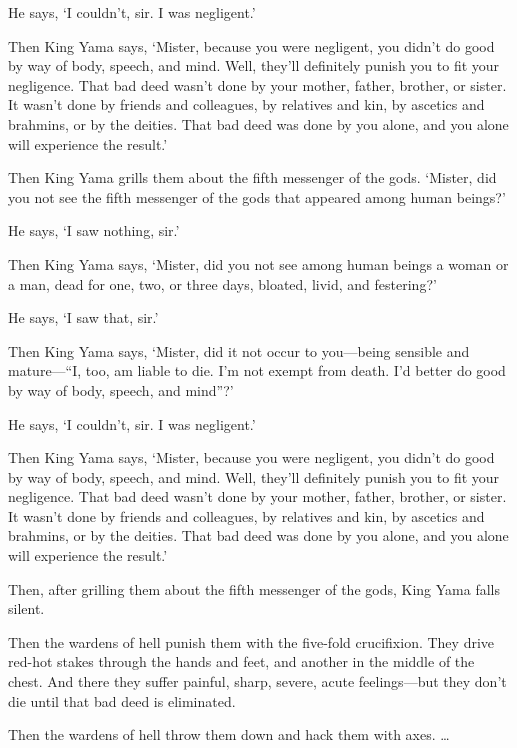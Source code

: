 \documentclass[12pt,openany]{book}%
\begin{document}
He says, ‘I couldn’t, sir. I was negligent.’ 

Then King Yama says, ‘Mister, because you were negligent, you didn’t do good by way of body, speech, and mind. Well, they’ll definitely punish you to fit your negligence. That bad deed wasn’t done by your mother, father, brother, or sister. It wasn’t done by friends and colleagues, by relatives and kin, by ascetics and brahmins, or by the deities. That bad deed was done by you alone, and you alone will experience the result.’ 

Then King Yama grills them about the fifth messenger of the gods. ‘Mister, did you not see the fifth messenger of the gods that appeared among human beings?’ 

He says, ‘I saw nothing, sir.’ 

Then King Yama says, ‘Mister, did you not see among human beings a woman or a man, dead for one, two, or three days, bloated, livid, and festering?’ 

He says, ‘I saw that, sir.’ 

Then King Yama says, ‘Mister, did it not occur to you—being sensible and mature—“I, too, am liable to die. I’m not exempt from death. I’d better do good by way of body, speech, and mind”?’ 

He says, ‘I couldn’t, sir. I was negligent.’ 

Then King Yama says, ‘Mister, because you were negligent, you didn’t do good by way of body, speech, and mind. Well, they’ll definitely punish you to fit your negligence. That bad deed wasn’t done by your mother, father, brother, or sister. It wasn’t done by friends and colleagues, by relatives and kin, by ascetics and brahmins, or by the deities. That bad deed was done by you alone, and you alone will experience the result.’ 

Then, after grilling them about the fifth messenger of the gods, King Yama falls silent. 

Then the wardens of hell punish them with the five-fold crucifixion. They drive red-hot stakes through the hands and feet, and another in the middle of the chest. And there they suffer painful, sharp, severe, acute feelings—but they don’t die until that bad deed is eliminated. 

Then the wardens of hell throw them down and hack them with axes. … 
\end{document}

